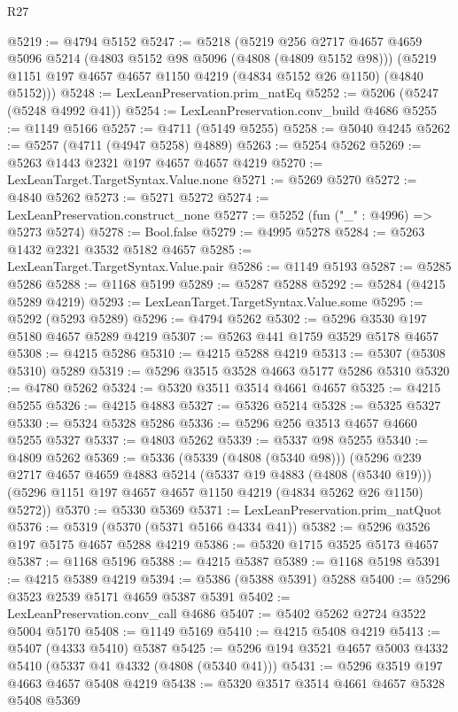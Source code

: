 \begin{lexlean}{R27}
\begin{coremodule}
@5219 := @4794 @5152
@5247 := @5218
    (@5219
      @256
      @2717
      @4657
      @4659
      @5096
      @5214
      (@4803 @5152 @98 @5096 (@4808 (@4809 @5152 @98)))
      (@5219 @1151 @197 @4657 @4657 @1150 @4219 (@4834 @5152 @26 @1150) (@4840 @5152)))
@5248 := LexLeanPreservation.prim_natEq
@5252 := @5206 (@5247 (@5248 @4992 @41))
@5254 := LexLeanPreservation.conv_build @4686
@5255 := @1149 @5166
@5257 := @4711 (@5149 @5255)
@5258 := @5040 @4245
@5262 := @5257 (@4711 (@4947 @5258) @4889)
@5263 := @5254 @5262
@5269 := @5263 @1443 @2321 @197 @4657 @4657 @4219
@5270 := LexLeanTarget.TargetSyntax.Value.none
@5271 := @5269 @5270
@5272 := @4840 @5262
@5273 := @5271 @5272
@5274 := LexLeanPreservation.construct_none
@5277 := @5252 (fun ("_" : @4996) => @5273 @5274)
@5278 := Bool.false
@5279 := @4995 @5278
@5284 := @5263 @1432 @2321 @3532 @5182 @4657
@5285 := LexLeanTarget.TargetSyntax.Value.pair
@5286 := @1149 @5193
@5287 := @5285 @5286
@5288 := @1168 @5199
@5289 := @5287 @5288
@5292 := @5284 (@4215 @5289 @4219)
@5293 := LexLeanTarget.TargetSyntax.Value.some
@5295 := @5292 (@5293 @5289)
@5296 := @4794 @5262
@5302 := @5296 @3530 @197 @5180 @4657 @5289 @4219
@5307 := @5263 @441 @1759 @3529 @5178 @4657
@5308 := @4215 @5286
@5310 := @4215 @5288 @4219
@5313 := @5307 (@5308 @5310) @5289
@5319 := @5296 @3515 @3528 @4663 @5177 @5286 @5310
@5320 := @4780 @5262
@5324 := @5320 @3511 @3514 @4661 @4657
@5325 := @4215 @5255
@5326 := @4215 @4883
@5327 := @5326 @5214
@5328 := @5325 @5327
@5330 := @5324 @5328 @5286
@5336 := @5296 @256 @3513 @4657 @4660 @5255 @5327
@5337 := @4803 @5262
@5339 := @5337 @98 @5255
@5340 := @4809 @5262
@5369 := @5336
    (@5339 (@4808 (@5340 @98)))
    (@5296
      @239
      @2717
      @4657
      @4659
      @4883
      @5214
      (@5337 @19 @4883 (@4808 (@5340 @19)))
      (@5296 @1151 @197 @4657 @4657 @1150 @4219 (@4834 @5262 @26 @1150) @5272))
@5370 := @5330 @5369
@5371 := LexLeanPreservation.prim_natQuot
@5376 := @5319 (@5370 (@5371 @5166 @4334 @41))
@5382 := @5296 @3526 @197 @5175 @4657 @5288 @4219
@5386 := @5320 @1715 @3525 @5173 @4657
@5387 := @1168 @5196
@5388 := @4215 @5387
@5389 := @1168 @5198
@5391 := @4215 @5389 @4219
@5394 := @5386 (@5388 @5391) @5288
@5400 := @5296 @3523 @2539 @5171 @4659 @5387 @5391
@5402 := LexLeanPreservation.conv_call @4686
@5407 := @5402 @5262 @2724 @3522 @5004 @5170
@5408 := @1149 @5169
@5410 := @4215 @5408 @4219
@5413 := @5407 (@4333 @5410) @5387
@5425 := @5296 @194 @3521 @4657 @5003 @4332 @5410 (@5337 @41 @4332 (@4808 (@5340 @41)))
@5431 := @5296 @3519 @197 @4663 @4657 @5408 @4219
@5438 := @5320 @3517 @3514 @4661 @4657 @5328 @5408 @5369

\end{coremodule}
\end{lexlean}
